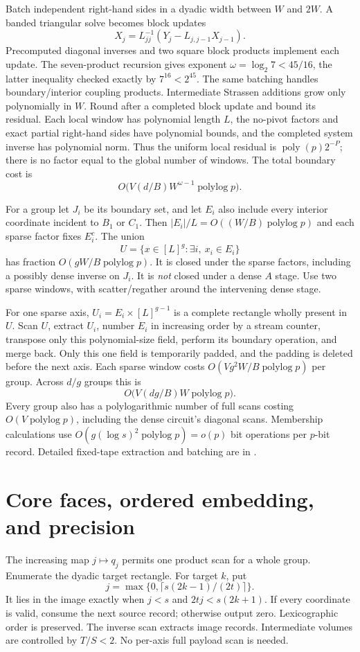 \documentclass[11pt]{article}
\newcommand{\poly}{\operatorname{poly}}
\newcommand{\plog}{\operatorname{polylog}}
\newcommand{\file}[1]{\href{#1}{\texttt{\detokenize{#1}}}}
\begin{document}
Batch independent right-hand sides in a dyadic width between $W$ and $2W$. A banded triangular solve becomes block updates
\[
 X_j=L_{jj}^{-1}(Y_j-L_{j,j-1}X_{j-1}).
\]
Precomputed diagonal inverses and two square block products implement each update. The seven-product recursion gives exponent $\omega=\log_2 7<45/16$, the latter inequality checked exactly by $7^{16}<2^{45}$. The same batching handles boundary/interior coupling products. Intermediate Strassen additions grow only polynomially in $W$. Round after a completed block update and bound its residual. Each local window has polynomial length $L$, the no-pivot factors and exact partial right-hand sides have polynomial bounds, and the completed system inverse has polynomial norm. Thus the uniform local residual is $\poly(p)2^{-P}$; there is no factor equal to the global number of windows. The total boundary cost is
\[
 O\bigl(V(d/B)W^{\omega-1}\plog p\bigr).
\]

For a group let $J_i$ be its boundary set, and let $E_i$ also include every interior coordinate incident to $B_1$ or $C_1$. Then $|E_i|/L=O((W/B)\plog p)$ and each sparse factor fixes $E_i^c$. The union
\[
 U=\{x\in[L]^g:\exists i,\ x_i\in E_i\}
\]
has fraction $O(gW/B\plog p)$. It is closed under the sparse factors, including a possibly dense inverse on $J_i$. It is \emph{not} closed under a dense $A$ stage. Use two sparse windows, with scatter/regather around the intervening dense stage.

For one sparse axis, $U_i=E_i\times[L]^{g-1}$ is a complete rectangle wholly present in $U$. Scan $U$, extract $U_i$, number $E_i$ in increasing order by a stream counter, transpose only this polynomial-size field, perform its boundary operation, and merge back. Only this one field is temporarily padded, and the padding is deleted before the next axis. Each sparse window costs $O(Vg^2W/B\plog p)$ per group. Across $d/g$ groups this is
\[
 O\bigl(V(dg/B)W\plog p\bigr).
\]
Every group also has a polylogarithmic number of full scans costing $O(V\plog p)$, including the dense circuit's diagonal scans. Membership calculations use $O(g(\log s)^2\plog p)=o(p)$ bit operations per $p$-bit record. Detailed fixed-tape extraction and batching are in \file{PHASE-LAYOUT-AUDIT.md}.

\section{Core faces, ordered embedding, and precision}

The increasing map $j\mapsto q_j$ permits one product scan for a whole group. Enumerate the dyadic target rectangle. For target $k$, put
\[
 j=\max\{0,\lceil s(2k-1)/(2t)\rceil\}.
\]
It lies in the image exactly when $j<s$ and $2tj<s(2k+1)$. If every coordinate is valid, consume the next source record; otherwise output zero. Lexicographic order is preserved. The inverse scan extracts image records. Intermediate volumes are controlled by $T/S<2$. No per-axis full payload scan is needed.
\end{document}
